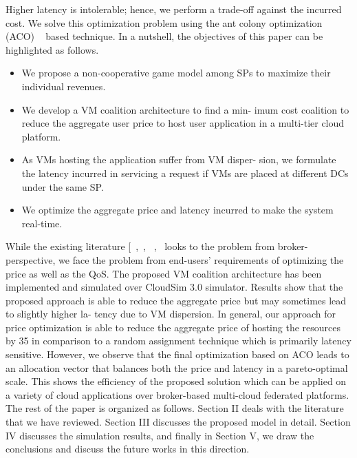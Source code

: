 \documentclass[conference]{IEEEtran}
\newcommand\tab[1][0.8cm]{\hspace*{#1}}
\begin{document}
Higher latency is intolerable; hence, we perform a trade-off
against the incurred cost. We solve this optimization problem
using the ant colony optimization (ACO) ~\cite{b6} based technique.
In a nutshell, the objectives of this paper can be highlighted
as follows.
\begin{itemize}
	\item We propose a non-cooperative game model among SPs
	to maximize their individual revenues.
	\item We develop a VM coalition architecture to find a min-
	imum cost coalition to reduce the aggregate user price
	to host user application in a multi-tier cloud platform.
	\item As VMs hosting the application suffer from VM disper-
	sion, we formulate the latency incurred in servicing a
	request if VMs are placed at different DCs under the
	same SP.
	\item We optimize the aggregate price and latency incurred to
	make the system real-time.
\end{itemize}
While the existing literature [~\cite{b1},~\cite{b2}, ~\cite{b3}, ~\cite{b4}looks to
the problem from broker-perspective, we face the problem
from end-users’ requirements of optimizing the price as well
as the QoS. The proposed VM coalition architecture has
been implemented and simulated over CloudSim 3.0 simulator.
Results show that the proposed approach is able to reduce the
aggregate price but may sometimes lead to slightly higher la-
tency due to VM dispersion. In general, our approach for price
optimization is able to reduce the aggregate price of hosting
the resources by 35%
in comparison to a random assignment technique which is
primarily latency sensitive. However, we observe that the final
optimization based on ACO leads to an allocation vector that
balances both the price and latency in a pareto-optimal scale.
This shows the efficiency of the proposed solution which can
be applied on a variety of cloud applications over broker-based
multi-cloud federated platforms.
\newline
\tab The rest of the paper is organized as follows. Section II deals with the literature that we have reviewed. Section III
discusses the proposed model in detail. Section IV discusses
the simulation results, and finally in Section V, we draw the
conclusions and discuss the future works in this direction.
\end{document}
